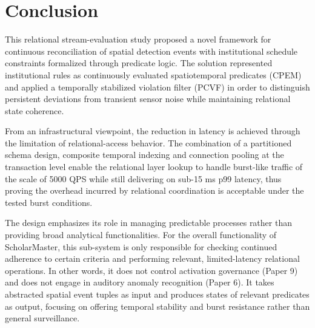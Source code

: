 \documentclass[conference]{IEEEtran}
\begin{document}
\section{Conclusion}
This relational stream-evaluation study proposed a novel framework for continuous reconciliation of spatial detection events with institutional schedule constraints formalized through predicate logic. The solution represented institutional rules as continuously evaluated spatiotemporal predicates (CPEM) and applied a temporally stabilized violation filter (PCVF) in order to distinguish persistent deviations from transient sensor noise while maintaining relational state coherence.

From an infrastructural viewpoint, the reduction in latency is achieved through the limitation of relational-access behavior. The combination of a partitioned schema design, composite temporal indexing and connection pooling at the transaction level enable the relational layer lookup to handle burst-like traffic of the scale of 5000 QPS while still delivering on sub-15 ms p99 latency, thus proving the overhead incurred by relational coordination is acceptable under the tested burst conditions.

The design emphasizes its role in managing predictable processes rather than providing broad analytical functionalities. For the overall functionality of ScholarMaster, this sub-system is only responsible for checking continued adherence to certain criteria and performing relevant, limited-latency relational operations. In other words, it does not control activation governance (Paper 9) and does not engage in auditory anomaly recognition (Paper 6). It takes abstracted spatial event tuples as input and produces states of relevant predicates as output, focusing on offering temporal stability and burst resistance rather than general surveillance.
\end{document}
